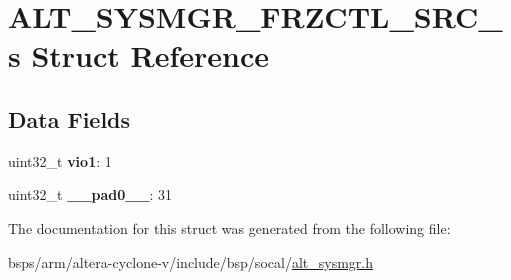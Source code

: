 \hypertarget{structALT__SYSMGR__FRZCTL__SRC__s}{}\section{A\+L\+T\+\_\+\+S\+Y\+S\+M\+G\+R\+\_\+\+F\+R\+Z\+C\+T\+L\+\_\+\+S\+R\+C\+\_\+s Struct Reference}
\label{structALT__SYSMGR__FRZCTL__SRC__s}
\subsection*{Data Fields}
\begin{DoxyCompactItemize}
\item 
\mbox{\label{structALT__SYSMGR__FRZCTL__SRC__s_a222ba8623488aaa375b1b4ad0d1828c1}} 
uint32\+\_\+t {\bfseries vio1}\+: 1
\item 
\mbox{\label{structALT__SYSMGR__FRZCTL__SRC__s_ad5eb01d5ed9d136ceb3f1a4cd77a46b1}} 
uint32\+\_\+t {\bfseries \+\_\+\+\_\+pad0\+\_\+\+\_\+}\+: 31
\end{DoxyCompactItemize}


The documentation for this struct was generated from the following file\+:\begin{DoxyCompactItemize}
\item 
bsps/arm/altera-\/cyclone-\/v/include/bsp/socal/\mbox{\hyperlink{alt__sysmgr_8h}{alt\+\_\+sysmgr.\+h}}\end{DoxyCompactItemize}
